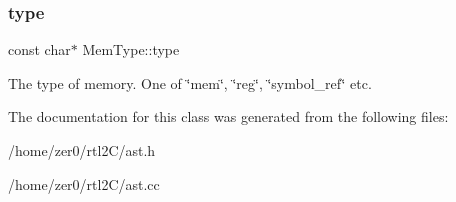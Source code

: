 \subsubsection{\texorpdfstring{type}{type}}
{\footnotesize\ttfamily const char$\ast$ Mem\+Type\+::type\hspace{0.3cm}{\ttfamily [protected]}}

The type of memory. One of \char`\"{}mem\char`\"{}, \char`\"{}reg\char`\"{}, \char`\"{}symbol\+\_\+ref\char`\"{} etc. 

The documentation for this class was generated from the following files\+:\begin{DoxyCompactItemize}
\item 
/home/zer0/rtl2\+C/ast.\+h\item 
/home/zer0/rtl2\+C/ast.\+cc\end{DoxyCompactItemize}
